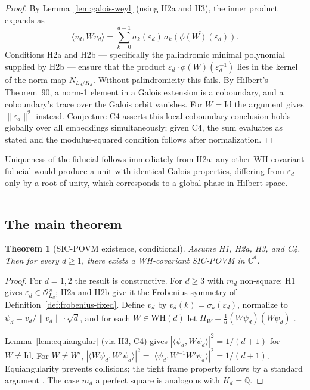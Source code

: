 \documentclass[12pt]{article}
\theoremstyle{plain}
\newtheorem{theoreminner}{Theorem}[section]
\theoremstyle{definition}
\theoremstyle{remark}
\newenvironment{theorem}{\begin{mdframed}[style=thmstyle]\begin{theoreminner}}{\end{theoreminner}\end{mdframed}}
\newcommand{\WH}{\mathrm{WH}}
\newcommand{\OO}{\mathcal{O}}
\newcommand{\eps}{\varepsilon}
\newcommand{\bQ}{\mathbb{Q}}
\newcommand{\bC}{\mathbb{C}}
\begin{document}
\begin{proof}
  By Lemma~\ref{lem:galois-weyl} (using H2a and H3), the inner product expands as
  \[
    \langle v_d, W v_d \rangle = \sum_{k=0}^{d-1} \sigma_k(\eps_d)\, \overline{\sigma_k(\phi(W)(\eps_d))}.
  \]
  Conditions H2a and H2b — specifically the palindromic minimal polynomial supplied by H2b — ensure that the product $\eps_d \cdot \phi(W)(\eps_d^{-1})$ lies in the kernel of the norm map $N_{L_d/K_d}$. Without palindromicity this fails. By Hilbert's Theorem~90, a norm-1 element in a Galois extension is a coboundary, and a coboundary's trace over the Galois orbit vanishes. For $W = \mathrm{Id}$ the argument gives $\|\eps_d\|^2$ instead. Conjecture C4 asserts this local coboundary conclusion holds globally over all embeddings simultaneously; given C4, the sum evaluates as stated and the modulus-squared condition follows after normalization.
\end{proof}

Uniqueness of the fiducial follows immediately from H2a: any other WH-covariant fiducial would produce a unit with identical Galois properties, differing from $\eps_d$ only by a root of unity, which corresponds to a global phase in Hilbert space.

\medskip\noindent\rule{\linewidth}{0.3pt}\medskip

\subsection{The main theorem}

\begin{theorem}[SIC-POVM existence, conditional]
  \label{thm:sic-existence}
  Assume H1, H2a, H3, and C4. Then for every $d \geq 1$, there exists a WH-covariant SIC-POVM in $\bC^d$.
\end{theorem}

\begin{proof}
  For $d = 1, 2$ the result is constructive. For $d \geq 3$ with $m_d$ non-square: H1 gives $\eps_d \in \OO_{L_d}^\times$; H2a and H2b give it the Frobenius symmetry of Definition~\ref{def:frobenius-fixed}. Define $v_d$ by $v_d(k) = \sigma_k(\eps_d)$, normalize to $\psi_d = v_d/\|v_d\| \cdot \sqrt{d}$, and for each $W \in \WH(d)$ let $\Pi_W = \frac{1}{d}(W\psi_d)(W\psi_d)^\dagger$.

  Lemma~\ref{lem:equiangular} (via H3, C4) gives $|\langle \psi_d, W\psi_d\rangle|^2 = 1/(d+1)$ for $W \neq \mathrm{Id}$. For $W \neq W'$, $|\langle W\psi_d, W'\psi_d\rangle|^2 = |\langle \psi_d, W^{-1}W'\psi_d\rangle|^2 = 1/(d+1)$. Equiangularity prevents collisions; the tight frame property follows by a standard argument \cite{appleby2019}. The case $m_d$ a perfect square is analogous with $K_d = \bQ$.
\end{proof}
\end{document}
